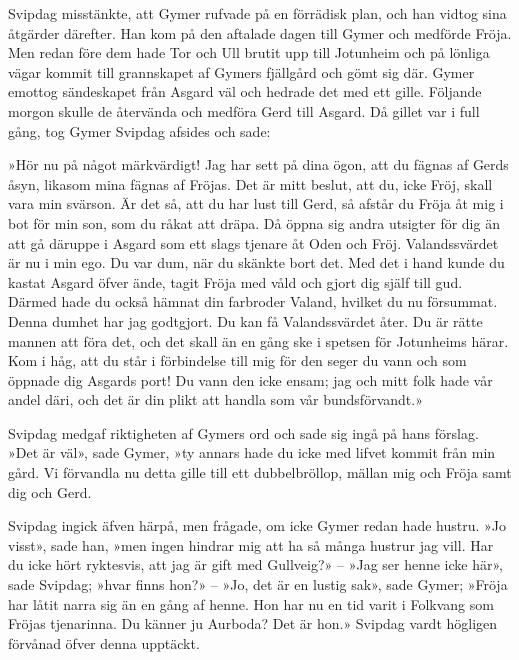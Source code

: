 Svipdag misstänkte, att Gymer rufvade på en förrädisk plan, och han
vidtog sina åtgärder därefter. Han kom på den aftalade dagen till Gymer
och medförde Fröja. Men redan före dem hade Tor och Ull brutit upp till
Jotunheim och på lönliga vägar kommit till grannskapet af Gymers
fjällgård och
\protect\hypertarget{lb1625905.xhtmlux5cux23start137}{}{}\protect\hypertarget{lb1625905.xhtmlux5cux23start137-a}{}{}\protect\hypertarget{lb1625905.xhtmlux5cux23start137-b}{}{}\protect\hypertarget{lb1625905.xhtmlux5cux23start137-c}{}{}\protect\hypertarget{lb1625905.xhtmlux5cux23start137-d}{}{}
gömt sig där. Gymer emottog sändeskapet från Asgard väl och hedrade det
med ett gille. Följande morgon skulle de återvända och medföra Gerd till
Asgard. Då gillet var i full gång, tog Gymer Svipdag afsides och sade:

»Hör nu på något märkvärdigt! Jag har sett på dina ögon, att du fägnas
af Gerds åsyn, likasom mina fägnas af Fröjas. Det är mitt beslut, att
du, icke Fröj, skall vara min svärson. Är det så, att du har lust till
Gerd, så afstår du Fröja åt mig i bot för min son, som du råkat att
dräpa. Då öppna sig andra utsigter för dig än att gå däruppe i Asgard
som ett slags tjenare åt Oden och Fröj. Valandssvärdet är nu i min ego.
Du var dum, när du skänkte bort det. Med det i hand kunde du kastat
Asgard öfver ände, tagit Fröja med våld och gjort dig själf till gud.
Därmed hade du också hämnat din farbroder Valand, hvilket du nu
försummat. Denna dumhet har jag godtgjort. Du kan få Valandssvärdet
åter. Du är rätte mannen att föra det, och det skall än en gång ske i
spetsen för Jotunheims härar. Kom i håg, att du står i förbindelse till
mig för den seger du vann och som öppnade dig Asgards port! Du vann den
icke ensam; jag och mitt folk hade vår andel däri, och det är din plikt
att handla som vår bundsförvandt.»

Svipdag medgaf riktigheten af Gymers ord och sade sig ingå på hans
förslag. »Det är väl», sade Gymer, »ty annars hade du icke med lifvet
kommit från min gård. Vi förvandla nu detta gille till ett
dubbelbröllop, mällan mig och Fröja samt dig och Gerd.

Svipdag ingick äfven härpå, men frågade, om icke Gymer redan hade
hustru. »Jo visst», sade han, »men ingen hindrar mig att ha så många
hustrur jag vill. Har du icke hört ryktesvis, att jag är gift med
Gullveig?» -- »Jag ser henne icke här», sade Svipdag; »hvar finns hon?»
-- »Jo, det är en lustig sak», sade Gymer; »Fröja har låtit narra sig än
en gång af henne. Hon har nu en tid varit i Folkvang som Fröjas
tjenarinna. Du känner ju Aurboda? Det är hon.» Svipdag vardt högligen
förvånad öfver denna upptäckt.

